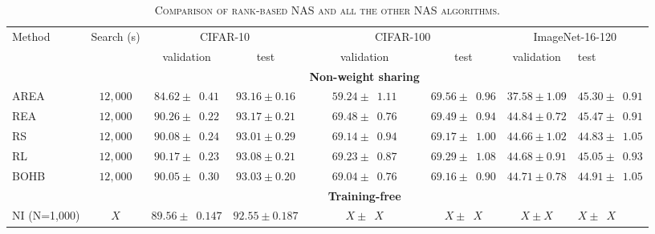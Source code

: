 \documentclass[sigconf]{acmart}
\begin{document}
    \begin{table*}[htb]
        \newcommand{\z}{\phantom{0}}
        \caption{\textsc{Comparison of rank-based NAS and all the other NAS algorithms.}}
          \vspace{-\baselineskip}
        \begin{tabular}{@{}lccccccl@{}}\toprule
        Method & Search (s) & \multicolumn{2}{c}{CIFAR-10} & \multicolumn{2}{c}{CIFAR-100} & \multicolumn{2}{c}{ImageNet-16-120} \\ \cmidrule(lr){3-4}\cmidrule(lr){5-6}\cmidrule(lr){7-8}
        & & validation & test & validation & test & validation & test \\ \midrule
        &&&&\textbf{Non-weight sharing}&&&\\
        AREA      & $12,000$ & $84.62 \pm \z{0.41}$                & $93.16 \pm 0.16$               & $59.24 \pm \z{1.11}$                 & $69.56 \pm \z{0.96}$                & $37.58 \pm 1.09$                 & $45.30 \pm \z{0.91}$                \\
        REA       & $12,000$ & $90.26 \pm \z{0.22}$                & $93.17 \pm 0.21$               & $69.48 \pm \z{0.76}$                 & $69.49 \pm \z{0.94}$                & $44.84 \pm 0.72$                 & $45.47 \pm \z{0.91}$                \\
        RS        & $12,000$ & $90.08 \pm \z{0.24}$                & $93.01 \pm 0.29$               & $69.14 \pm \z{0.94}$                 & $69.17 \pm \z{1.00}$                & $44.66 \pm 1.02$                 & $44.83 \pm \z{1.05}$                \\
        RL        & $12,000$ & $90.17 \pm \z{0.23}$                & $93.08 \pm 0.21$               & $69.23 \pm \z{0.87}$                 & $69.29 \pm \z{1.08}$                & $44.68 \pm 0.91$                 & $45.05 \pm \z{0.93}$                \\
        BOHB      & $12,000$ & $90.05 \pm \z{0.30}$                & $93.03 \pm 0.20$               & $69.04 \pm \z{0.76}$                 & $69.16 \pm \z{0.90}$                & $44.71 \pm 0.78$                 & $44.91 \pm \z{1.05}$                \\ \midrule
        &&&&\textbf{Training-free}&&&\\
        NI (N=1,000) & $X$ & $89.56\pm \z{0.147}$ & $92.55\pm 0.187$ & $X\pm \z{X}$ & $X\pm \z{X}$ & $X\pm X$ & $X\pm \z{X}$ \\ 

\end{tabular}
\end{table*}
\end{document}

